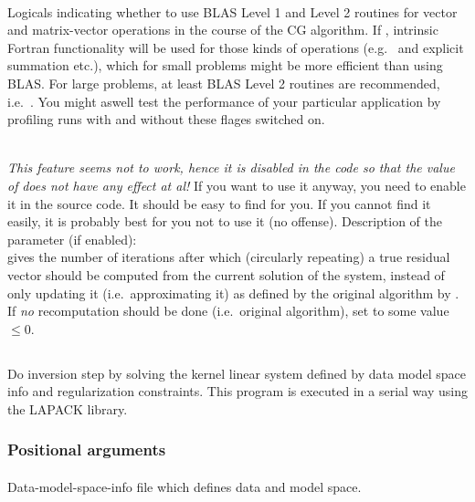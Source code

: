 \textbf{}\\
Logicals indicating whether to use BLAS Level 1 and Level 2 routines for vector and
matrix-vector operations in the course of the CG algorithm. If , intrinsic Fortran
functionality will be used for those kinds of operations (e.g.\  and explicit summation etc.),
which for small problems might be more efficient than using BLAS. For large problems, at least
BLAS Level 2 routines are recommended, i.e.\ . You might aswell test the 
performance of your particular application by profiling runs with and without these flages switched on.

\textbf{}\\
\emph{This feature seems not to work, hence it is disabled in the code so 
that the value of}  \emph{does not have any effect at al!}
If you want to use it anyway, you need to enable it in the source code. It should
be easy to find for you. If you cannot find it easily, it is probably best 
for you not to use it (no offense). Description of the parameter (if enabled):\\
 gives the number of iterations after which (circularly repeating) a true 
residual vector should be computed from the current solution of the system, instead of only updating it 
(i.e.\ approximating it) as defined by the original algorithm by \cite{bjorck1998stability}.
If \emph{no} recomputation should be done (i.e.\ original algorithm), set 
to some value $\le 0$.
%
%
\subsection{} \label{programs_scripts,sec:bin_prog,sec:sol_Ker_Sys}
Do inversion step by solving the kernel linear system defined by data model space info and regularization constraints. 
This program is executed in a serial way using the LAPACK library.

\subsubsection{Positional arguments}
\paragraph{}
Data-model-space-info file which defines data and model space.
